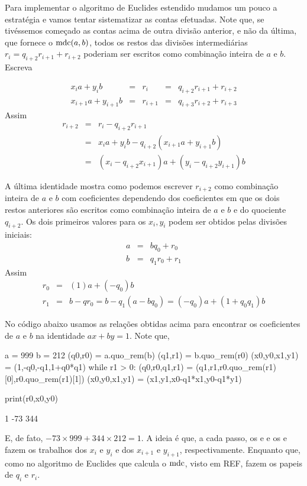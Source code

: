 Para implementar o algoritmo de Euclides estendido mudamos um
pouco a estratégia e vamos tentar sistematizar as contas efetuadas.
Note que, se tivéssemos começado as contas acima de outra divisão anterior,
e não da última, que fornece o $\operatorname{mdc}(a,b)$, todos os
restos das divisões intermediárias $r_i = q_{i+2}r_{i+1} +r_{i+2}$
poderiam ser escritos como combinação inteira de $a$ e $b$. Escreva

$$
\begin{array}{rcccl}
   x_{i} a+y_{i} b & = & r_{i} &  = & q_{i+2}r_{i+1} + r_{i+2}\\
  x_{i+1} a+y_{i+1} b& = & r_{i+1} &  = & q_{i+3}r_{i+2} + r_{i+3} 
\end{array}
$$
Assim
$$
\begin{array}{rcl}
  r_{i+2} & = & r_{i} - q_{i+2}r_{i+1} \\
   & = &  x_{i} a+y_{i} b - q_{i+2}(x_{i+1} a+y_{i+1} b) \\
   & = & (x_i - q_{i+2}x_{i+1})a + (y_i - q_{i+2}y_{i+1})b
\end{array}
$$

A última identidade mostra como podemos escrever
$r_{i+2}$ como combinação inteira de $a$ e $b$ com coeficientes
dependendo dos coeficientes em que os dois restos anteriores são
escritos como combinação inteira de $a$ e $b$ e do quociente
$q_{i+2}$. Os dois primeiros valores para os $x_i,y_i$ podem
ser obtidos pelas divisões iniciais:
$$
\begin{array}{rcl}
  a & = & bq_0 + r_0 \\
  b & = & q_1r_0 + r_1 
\end{array}
$$
Assim 
$$
\begin{array}{rcl}
  r_0 & = & (1)a + (-q_0)b\\
  r_1 & = & b - qr_0 = b - q_1(a-bq_0) = (-q_0)a + (1+q_0q_1)b
\end{array}
$$

No código \Sage abaixo usamos as relações obtidas
acima para encontrar os coeficientes de $a$ e $b$ na
identidade $ax+by = 1$. Note que, 

\begin{sageinput}
a = 999
b = 212
(q0,r0) = a.quo_rem(b)
(q1,r1) = b.quo_rem(r0)
(x0,y0,x1,y1) = (1,-q0,-q1,1+q0*q1)
while r1 > 0:
    (q0,r0,q1,r1) = (q1,r1,r0.quo_rem(r1)[0],r0.quo_rem(r1)[1])
    (x0,y0,x1,y1) = (x1,y1,x0-q1*x1,y0-q1*y1)    
    
print(r0,x0,y0)
\end{sageinput}
\begin{sageoutput}
1 -73 344
\end{sageoutput}
E, de fato, $-73\times 999+344\times212 =1$. A ideia é que,
a cada passo, 
os  e  e os  e  fazem os
trabalhos dos $x_i$ e $y_i$  e dos $x_{i+1}$ e $y_{i+1}$, 
respectivamente. Enquanto que, como no algoritmo de Euclides
que calcula o $\operatorname{mdc}$, visto em REF,   fazem os papeis 
de $q_{i}$ e $r_i$.

